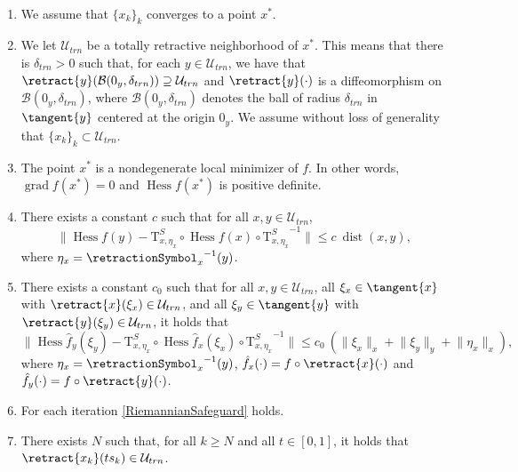 \begin{assumption}\label{RiemannianAssumptionsLocalConvergence} \ \\[-1.5\baselineskip]
    \begin{enumerate}
        \item We assume that $\{ x_k \}_k$ converges to a point $x^*$.
        \item We let $\mathcal{U}_{trn}$ be a totally retractive neighborhood of $x^*$. This means that there is $\delta_{trn} > 0$ such that, for each $y \in \mathcal{U}_{trn}$, we have that $\retract{y}(\mathcal{B}(0_y, \delta_{trn})) \supseteq \mathcal{U}_{trn}$ and $\retract{y}(\cdot)$ is a diffeomorphism on $\mathcal{B}(0_y, \delta_{trn})$, where $\mathcal{B}(0_y, \delta_{trn})$ denotes the ball of radius $\delta_{trn}$ in $\tangent{y}$ centered at the origin $0_y$. We assume without loss of generality that $\{ x_k \}_k \subset \mathcal{U}_{trn}$.
        \item The point $x^*$ is a nondegenerate local minimizer of $f$. In other words, $\operatorname{grad} f(x^*) = 0$ and $\operatorname{Hess} f(x^*)$ is positive definite.
        \item There exists a constant $c$ such that for all $x, y \in \mathcal{U}_{trn}$, \begin{equation*} \lVert \operatorname{Hess} f(y) - \mathrm{T}^{S}_{x, \eta_x} \circ \operatorname{Hess} f(x) \circ {\mathrm{T}^{S}_{x, \eta_x}}^{-1} \rVert \leq c \ \operatorname{dist}(x,y), \end{equation*} where $\eta_x = {\retractionSymbol_{x}}^{-1}(y)$.
        \item There exists a constant $c_0$ such that for all $x, y \in \mathcal{U}_{trn}$, all $\xi_x \in \tangent{x}$ with $\retract{x}(\xi_x) \in \mathcal{U}_{trn}$, and all $\xi_y \in \tangent{y}$ with $\retract{y}(\xi_y) \in \mathcal{U}_{trn}$, it holds that \begin{equation*} \lVert \operatorname{Hess} \hat{f}_y(\xi_y) - \mathrm{T}^{S}_{x, \eta_x} \circ \operatorname{Hess} \hat{f}_x(\xi_x) \circ {\mathrm{T}^{S}_{x, \eta_x}}^{-1} \rVert \leq c_0 \ (\lVert \xi_x \rVert_x + \lVert \xi_y \rVert_y + \lVert \eta_x \rVert_x), \end{equation*} where $\eta_x = {\retractionSymbol_{x}}^{-1}(y)$, $\hat{f}_x(\cdot) = f \circ \retract{x}(\cdot)$ and $\hat{f}_y(\cdot) = f \circ \retract{y}(\cdot)$.
        \item For each iteration \cref{RiemannianSafeguard} holds.
        \item There exists $N$ such that, for all $k \geq N$ and all $t \in [0, 1]$, it holds that $\retract{x_k}(t s_k) \in \mathcal{U}_{trn}$.
    \end{enumerate}
\end{assumption}
